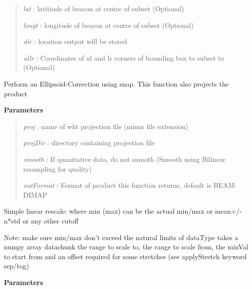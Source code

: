 \documentclass[letterpaper,10pt,openany,oneside]{sphinxmanual}
\begin{document}
\begin{fulllineitems}
\begin{fulllineitems}
\begin{quote}
\emph{lat} : latitiude of beacon at centre of subset (Optional)

\emph{longt} : longitude of beacon at centre of subset (Optional)

\emph{dir} : location output will be stored

\emph{ullr} : Coordinates of ul and lr corners of bounding box to subset to (Optional)
\end{quote}

\end{fulllineitems}


\begin{fulllineitems}
\label{code:Image.Image.snapTC}
Perform an Ellipsoid-Correction using snap. This function also projects the product

\textbf{Parameters}
\begin{quote}

\emph{proj} : name of wkt projection file (minus file extension)

\emph{projDir} : directory containing projection file

\emph{smooth} : If quanitative data, do not smooth (Smooth using Bilinear resampling for quality)

\emph{outFormat} : Format of product this function returns, default is BEAM-DIMAP
\end{quote}

\end{fulllineitems}


\begin{fulllineitems}
\label{code:Image.Image.stretchLinear}
Simple linear rescale: where min (max) can be the actual min/max or mean+/- n*std or any other cutoff

Note: make sure min/max don't exceed the natural limits of dataType
takes a numpy array datachunk the range to scale to, the range to scale
from, the minVal to start from and an offset required for some stretches
(see applyStretch keyword sep/tog)

\textbf{Parameters}
\begin{quote}


\end{quote}
\end{fulllineitems}
\end{fulllineitems}
\end{document}
